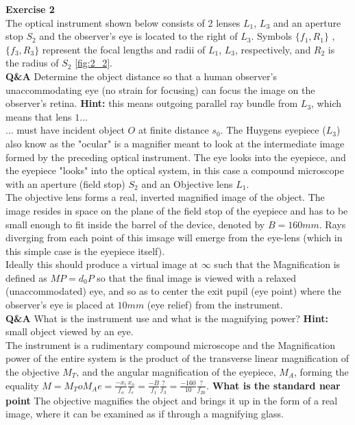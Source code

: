 \documentclass[main.tex]{subfiles}
\begin{document}
\textbf{Exercise 2}\\
The optical instrument shown below consists of 2 lenses $L_1$, $L_3$ and an aperture stop $S_2$ and the observer's eye is located to the right of $L_3$. Symbols $\{f_1 , R_1\}$ , $\{f_3 , R_3\}$ represent the focal lengths and radii of $L_1$, $L_3$, respectively, and $R_2$ is the radius of $S_2$ \ref{fig:2_2}.\\

\textbf{Q\&A} Determine the object distance so that a human observer's unaccommodating eye (no strain for focusing) can focus the image on the observer's retina. \textbf{Hint:} this means outgoing parallel ray bundle from $L_3$, which means that lens $1 ...$\\

... must have incident object $O$ at finite distance $s_0$. The Huygens eyepiece ($L_3$) also know as the "ocular" is a magnifier meant to look at the intermediate image formed by the preceding optical instrument. The eye looks into the eyepiece, and the eyepiece "looks" into the optical system, in this case a compound microscope with an aperture (field stop) $S_2$ and an Objective lens $L_1$.\\

The objective lens forms a real, inverted magnified image of the object. The image resides in space on the plane of the field stop of the eyepiece and has to be small enough to fit inside the barrel of the device, denoted by $B=160mm$. Rays diverging from each point of this imsage will emerge from the eye-lens (which in this simple case is the eyepiece itself).\\ 

Ideally this should produce a virtual image at $\infty$ such that the Magnification is defined as $MP=d_0P$ so that the final image is viewed with a relaxed (unaccommodated) eye, and so as to center the exit pupil (eye point) where the observer's eye is placed at $10mm$ (eye relief) from the instrument.\\



\textbf{Q\&A} What is the instrument use and what is the magnifying power? \textbf{Hint:} small object viewed by an eye.\\

The instrument is a rudimentary compound microscope and the Magnification power of the entire system is the product of the transverse linear magnification of the objective $M_T$, and the angular magnification of the eyepiece, $M_A$, forming the equality $M = M_To M_Ae = \frac{-x_i}{f_o} \frac{x_o}{f_e} = \frac{-B}{f_1} \frac{?}{f_3} = \frac{-160}{10} \frac{?}{f_20}$. \textbf{What is the standard near point} The objective magnifies the object and brings it up in the form of a real image, where it can be examined as if through a magnifying glass.  
\end{document}
